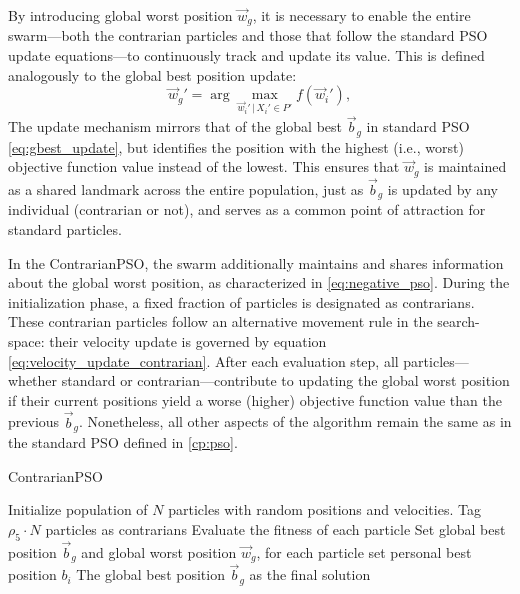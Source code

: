 {By introducing global worst position  $\vec{w}_g$, it is necessary to enable the entire swarm---both the contrarian particles and those that follow the standard PSO update equations---to continuously track and update its value. This is defined analogously to the global best position update:
\begin{equation}
    \vec{w}_g' = \arg\max_{\vec{w}_i'\,|\, X_i' \in P'} f(\vec{w}_i'),
    \label{eq:gworst_update}
\end{equation}
The update mechanism mirrors that of the global best $\vec{b}_g$ in standard PSO \eqref{eq:gbest_update}, but identifies the position with the highest (i.e., worst) objective function value instead of the lowest. This ensures that $\vec{w}_g$ is maintained as a shared landmark across the entire population, just as $\vec{b}_g$ is updated by any individual (contrarian or not), and serves as a common point of attraction for standard particles.

In the ContrarianPSO, the swarm additionally maintains and shares information about the global worst position, as characterized in \eqref{eq:negative_pso}. During the initialization phase, a fixed fraction of particles is designated as contrarians. These contrarian particles follow an alternative movement rule in the \gls{search-space}: their velocity update is governed by equation \eqref{eq:velocity_update_contrarian}. After each evaluation step, all particles—whether standard or contrarian—contribute to updating the global worst position if their current positions yield a worse (higher) objective function value than the previous $\vec{b}_g$. Nonetheless, all other aspects of the algorithm remain the same as in the standard PSO defined in \autoref{cp:pso}.


\begin{algorithm}[H]
\caption{ContrarianPSO}\label{alg:contrarian}
Initialize population of \(N\) particles with random positions and velocities. Tag \(\rho_5 \cdot N\) particles as contrarians\;
Evaluate the fitness of each particle\;
Set global best position \(\vec{b}_g\) and global worst position \(\vec{w}_g\), for each particle set personal best position \(b_i\)\;
\Return The global best position \(\vec{b}_g\) as the final solution\;
\end{algorithm}

}
